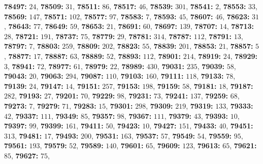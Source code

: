 \textsf{\bfseries 78497:} $24$, \textsf{\bfseries 78509:} $31$, \textsf{\bfseries 78511:} $86$, \textsf{\bfseries 78517:} $46$, \textsf{\bfseries 78539:} $301$, \textsf{\bfseries 78541:} $2$, \textsf{\bfseries 78553:} $33$, \textsf{\bfseries 78569:} $147$, \textsf{\bfseries 78571:} $102$, \textsf{\bfseries 78577:} $97$, \textsf{\bfseries 78583:} $7$, \textsf{\bfseries 78593:} $45$, \textsf{\bfseries 78607:} $46$, \textsf{\bfseries 78623:} $31$, \textsf{\bfseries 78643:} $77$, \textsf{\bfseries 78649:} $59$, \textsf{\bfseries 78653:} $21$, \textsf{\bfseries 78691:} $60$, \textsf{\bfseries 78697:} $139$, \textsf{\bfseries 78707:} $14$, \textsf{\bfseries 78713:} $28$, \textsf{\bfseries 78721:} $191$, \textsf{\bfseries 78737:} $75$, \textsf{\bfseries 78779:} $29$, \textsf{\bfseries 78781:} $314$, \textsf{\bfseries 78787:} $112$, \textsf{\bfseries 78791:} $13$, \textsf{\bfseries 78797:} $7$, \textsf{\bfseries 78803:} $259$, \textsf{\bfseries 78809:} $202$, \textsf{\bfseries 78823:} $55$, \textsf{\bfseries 78839:} $201$, \textsf{\bfseries 78853:} $21$, \textsf{\bfseries 78857:} $5$, \textsf{\bfseries 78877:} $17$, \textsf{\bfseries 78887:} $63$, \textsf{\bfseries 78889:} $52$, \textsf{\bfseries 78893:} $112$, \textsf{\bfseries 78901:} $214$, \textsf{\bfseries 78919:} $24$, \textsf{\bfseries 78929:} $3$, \textsf{\bfseries 78941:} $72$, \textsf{\bfseries 78977:} $61$, \textsf{\bfseries 78979:} $22$, \textsf{\bfseries 78989:} $430$, \textsf{\bfseries 79031:} $235$, \textsf{\bfseries 79039:} $58$, \textsf{\bfseries 79043:} $20$, \textsf{\bfseries 79063:} $294$, \textsf{\bfseries 79087:} $110$, \textsf{\bfseries 79103:} $160$, \textsf{\bfseries 79111:} $118$, \textsf{\bfseries 79133:} $78$, \textsf{\bfseries 79139:} $24$, \textsf{\bfseries 79147:} $14$, \textsf{\bfseries 79151:} $257$, \textsf{\bfseries 79153:} $198$, \textsf{\bfseries 79159:} $58$, \textsf{\bfseries 79181:} $18$, \textsf{\bfseries 79187:} $282$, \textsf{\bfseries 79193:} $27$, \textsf{\bfseries 79201:} $70$, \textsf{\bfseries 79229:} $98$, \textsf{\bfseries 79231:} $73$, \textsf{\bfseries 79241:} $137$, \textsf{\bfseries 79259:} $68$, \textsf{\bfseries 79273:} $7$, \textsf{\bfseries 79279:} $71$, \textsf{\bfseries 79283:} $15$, \textsf{\bfseries 79301:} $298$, \textsf{\bfseries 79309:} $219$, \textsf{\bfseries 79319:} $133$, \textsf{\bfseries 79333:} $42$, \textsf{\bfseries 79337:} $111$, \textsf{\bfseries 79349:} $85$, \textsf{\bfseries 79357:} $98$, \textsf{\bfseries 79367:} $111$, \textsf{\bfseries 79379:} $43$, \textsf{\bfseries 79393:} $10$, \textsf{\bfseries 79397:} $99$, \textsf{\bfseries 79399:} $161$, \textsf{\bfseries 79411:} $50$, \textsf{\bfseries 79423:} $10$, \textsf{\bfseries 79427:} $151$, \textsf{\bfseries 79433:} $40$, \textsf{\bfseries 79451:} $313$, \textsf{\bfseries 79481:} $17$, \textsf{\bfseries 79493:} $200$, \textsf{\bfseries 79531:} $163$, \textsf{\bfseries 79537:} $57$, \textsf{\bfseries 79549:} $54$, \textsf{\bfseries 79559:} $95$, \textsf{\bfseries 79561:} $193$, \textsf{\bfseries 79579:} $52$, \textsf{\bfseries 79589:} $140$, \textsf{\bfseries 79601:} $65$, \textsf{\bfseries 79609:} $123$, \textsf{\bfseries 79613:} $65$, \textsf{\bfseries 79621:} $85$, \textsf{\bfseries 79627:} $75$, 
